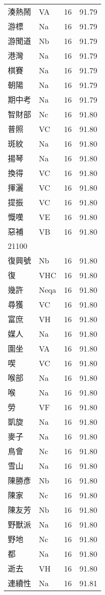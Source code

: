\documentclass[twocolumn]{book}
\begin{document}
\begin{supertabular}{llrr}
湊熱鬧 & VA & 16 &  91.79\\
游標 & Na & 16 &  91.79\\
游聞道 & Nb & 16 &  91.79\\
港灣 & Na & 16 &  91.79\\
棋賽 & Na & 16 &  91.79\\
朝陽 & Na & 16 &  91.79\\
期中考 & Na & 16 &  91.79\\
智財部 & Nc & 16 &  91.80\\
普照 & VC & 16 &  91.80\\
斑紋 & Na & 16 &  91.80\\
揚琴 & Na & 16 &  91.80\\
換得 & VC & 16 &  91.80\\
揮灑 & VC & 16 &  91.80\\
提振 & VC & 16 &  91.80\\
慨嘆 & VE & 16 &  91.80\\
惡補 & VB & 16 &  91.80\\
21100\\
復興號 & Nb & 16 &  91.80\\
復 & VHC & 16 &  91.80\\
幾許 & Neqa & 16 &  91.80\\
尋獲 & VC & 16 &  91.80\\
富庶 & VH & 16 &  91.80\\
媒人 & Na & 16 &  91.80\\
圍坐 & VA & 16 &  91.80\\
喫 & VC & 16 &  91.80\\
喉部 & Na & 16 &  91.80\\
喉 & Na & 16 &  91.80\\
勞 & VF & 16 &  91.80\\
凱旋 & Na & 16 &  91.80\\
麥子 & Na & 16 &  91.80\\
鳥會 & Nc & 16 &  91.80\\
雪山 & Na & 16 &  91.80\\
陳勝彥 & Nb & 16 &  91.80\\
陳家 & Nc & 16 &  91.80\\
陳友芳 & Nb & 16 &  91.80\\
野獸派 & Na & 16 &  91.80\\
野地 & Nc & 16 &  91.80\\
都 & Na & 16 &  91.80\\
逝去 & VH & 16 &  91.80\\
連續性 & Na & 16 &  91.81\\

\end{supertabular}
\end{document}

